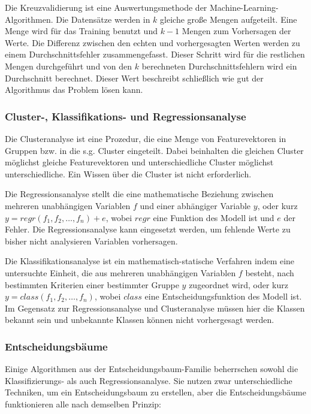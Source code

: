 \begin{term}[Kreuzvalidierung]
Die Kreuzvalidierung ist eine Auswertungsmethode der Machine-Learning-Algorithmen. 
Die Datensätze werden in $k$ gleiche große Mengen aufgeteilt. 
Eine Menge wird für das Training benutzt und $k-1$ Mengen zum Vorhersagen der Werte. 
Die Differenz zwischen den echten und vorhergesagten Werten werden zu einem Durchschnittsfehler zusammengefasst. 
Dieser Schritt wird für die restlichen Mengen durchgeführt und von den $k$ berechneten Durchschnittsfehlern wird ein Durchschnitt berechnet. 
Dieser Wert beschreibt schließlich wie gut der Algorithmus das Problem lösen kann.
\end{term}

\subsubsection{Cluster-, Klassifikations- und Regressionsanalyse}
Die Clusteranalyse ist eine Prozedur, die eine Menge von Featurevektoren in Gruppen bzw. in die s.g. Cluster eingeteilt. Dabei beinhalten die gleichen Cluster möglichst gleiche Featurevektoren und unterschiedliche Cluster möglichst unterschiedliche. Ein Wissen über die Cluster ist nicht erforderlich.

Die Regressionsanalyse stellt die eine mathematische Beziehung zwischen mehreren unabhängigen Variablen $f$ und einer abhängiger Variable $y$, oder kurz $y = regr(f_1, f_2, \dots, f_n) + e$, wobei $regr$ eine Funktion des Modell ist und $e$ der Fehler.
Die Regressionsanalyse kann eingesetzt werden, um fehlende Werte zu bisher nicht analysieren Variablen vorhersagen.

Die Klassifikationsanalyse ist ein mathematisch-statische Verfahren indem eine untersuchte Einheit, die aus mehreren unabhängigen Variablen $f$ besteht, nach bestimmten Kriterien einer bestimmter Gruppe $y$ zugeordnet wird, oder kurz $y = class(f_1, f_2, \dots, f_n)$, wobei $class$ eine Entscheidungsfunktion des Modell ist. Im Gegensatz zur Regressionsanalyse und Clusteranalyse müssen hier die Klassen bekannt sein und unbekannte Klassen können nicht vorhergesagt werden.


\subsubsection{Entscheidungsbäume}
Einige Algorithmen aus der Entscheidungsbaum-Familie beherrschen sowohl die Klassifizierungs- als auch Regressionsanalyse. 
Sie nutzen zwar unterschiedliche Techniken, um ein Entscheidungsbaum zu erstellen, aber die Entscheidungsbäume funktionieren alle nach demselben Prinzip: 

